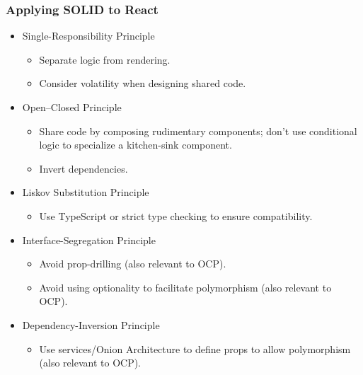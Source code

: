 \documentclass[aspectratio=169]{beamer}
\begin{document}
\begin{frame}

  \frametitle{Applying SOLID to React}

  \begin{itemize}
    \item Single-Responsibility Principle
          \begin{itemize}
            \item Separate logic from rendering.
            \item Consider volatility when designing shared code.
          \end{itemize}
    \item Open--Closed Principle
          \begin{itemize}
            \item Share code by composing rudimentary components; don't use
                  conditional logic to specialize a kitchen-sink component.
            \item Invert dependencies.
          \end{itemize}
    \item Liskov Substitution Principle
          \begin{itemize}
            \item Use TypeScript or strict type checking to ensure
                  compatibility.
          \end{itemize}
    \item Interface-Segregation Principle
          \begin{itemize}
            \item Avoid prop-drilling (also relevant to OCP).
            \item Avoid using optionality to facilitate polymorphism (also
                  relevant to OCP).
          \end{itemize}
    \item Dependency-Inversion Principle
          \begin{itemize}
            \item Use services/Onion Architecture to define props to allow
                  polymorphism (also relevant to OCP).
          \end{itemize}
  \end{itemize}

\end{frame}
\end{document}
